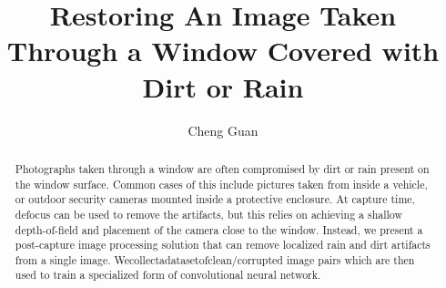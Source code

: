 \documentclass[10pt,twocolumn,letterpaper]{article}
\title{\textbf{Restoring An Image Taken Through a Window Covered with Dirt or Rain}}
\author{Cheng Guan}
\begin{document}
\maketitle
\begin{abstract}
Photographs taken through a window are often compromised by dirt or rain present on the window surface. Common cases of this include pictures taken from inside a vehicle, or outdoor security cameras mounted inside a protective enclosure. At capture time, defocus can be used to remove the artifacts, but this relies on achieving a shallow depth-of-field and placement of the camera close to the window. Instead, we present a post-capture image processing solution that can remove localized rain and dirt artifacts from a single image. Wecollectadatasetofclean/corrupted image pairs which are then used to train a specialized form of convolutional neural network.
\end{abstract}
\end{document}
